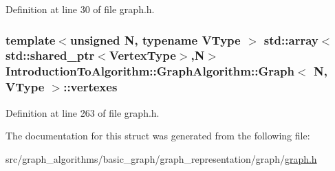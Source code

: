 Definition at line 30 of file graph.\+h.

\hypertarget{struct_introduction_to_algorithm_1_1_graph_algorithm_1_1_graph_aea254564996a6a172f001ebf7f3c5f65}{}
\subsubsection[{vertexes}]{\setlength{\rightskip}{0pt plus 5cm}template$<$unsigned N, typename V\+Type $>$ std\+::array$<$std\+::shared\+\_\+ptr$<${\bf Vertex\+Type}$>$,N$>$ {\bf Introduction\+To\+Algorithm\+::\+Graph\+Algorithm\+::\+Graph}$<$ N, V\+Type $>$\+::vertexes}\label{struct_introduction_to_algorithm_1_1_graph_algorithm_1_1_graph_aea254564996a6a172f001ebf7f3c5f65}


Definition at line 263 of file graph.\+h.



The documentation for this struct was generated from the following file\+:\begin{DoxyCompactItemize}
\item 
src/graph\+\_\+algorithms/basic\+\_\+graph/graph\+\_\+representation/graph/\hyperlink{graph_8h}{graph.\+h}\end{DoxyCompactItemize}
